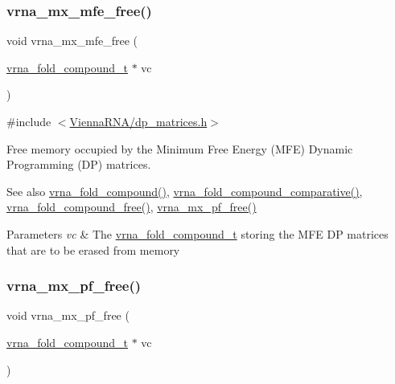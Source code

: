 \subsubsection{\texorpdfstring{vrna\+\_\+mx\+\_\+mfe\+\_\+free()}{vrna\_mx\_mfe\_free()}}
{\footnotesize\ttfamily void vrna\+\_\+mx\+\_\+mfe\+\_\+free (\begin{DoxyParamCaption}\item[{\hyperlink{group__fold__compound_ga1b0cef17fd40466cef5968eaeeff6166}{vrna\+\_\+fold\+\_\+compound\+\_\+t} $\ast$}]{vc }\end{DoxyParamCaption})}



{\ttfamily \#include $<$\hyperlink{dp__matrices_8h}{Vienna\+R\+N\+A/dp\+\_\+matrices.\+h}$>$}



Free memory occupied by the Minimum Free Energy (M\+FE) Dynamic Programming (DP) matrices. 

\begin{DoxySeeAlso}{See also}
\hyperlink{group__fold__compound_ga6601d994ba32b11511b36f68b08403be}{vrna\+\_\+fold\+\_\+compound()}, \hyperlink{group__fold__compound_gad6bacc816af274922b13d947f708aa0c}{vrna\+\_\+fold\+\_\+compound\+\_\+comparative()}, \hyperlink{group__fold__compound_gadded6039d63f5d6509836e20321534ad}{vrna\+\_\+fold\+\_\+compound\+\_\+free()}, \hyperlink{group__dp__matrices_ga2283e69fd139fb8e58d7ade3b5773f9c}{vrna\+\_\+mx\+\_\+pf\+\_\+free()}
\end{DoxySeeAlso}

\begin{DoxyParams}{Parameters}
{\em vc} & The \hyperlink{group__fold__compound_ga1b0cef17fd40466cef5968eaeeff6166}{vrna\+\_\+fold\+\_\+compound\+\_\+t} storing the M\+FE DP matrices that are to be erased from memory \\
\hline
\end{DoxyParams}
\mbox{\label{group__dp__matrices_ga2283e69fd139fb8e58d7ade3b5773f9c}} 
\subsubsection{\texorpdfstring{vrna\+\_\+mx\+\_\+pf\+\_\+free()}{vrna\_mx\_pf\_free()}}
{\footnotesize\ttfamily void vrna\+\_\+mx\+\_\+pf\+\_\+free (\begin{DoxyParamCaption}\item[{\hyperlink{group__fold__compound_ga1b0cef17fd40466cef5968eaeeff6166}{vrna\+\_\+fold\+\_\+compound\+\_\+t} $\ast$}]{vc }\end{DoxyParamCaption})}




